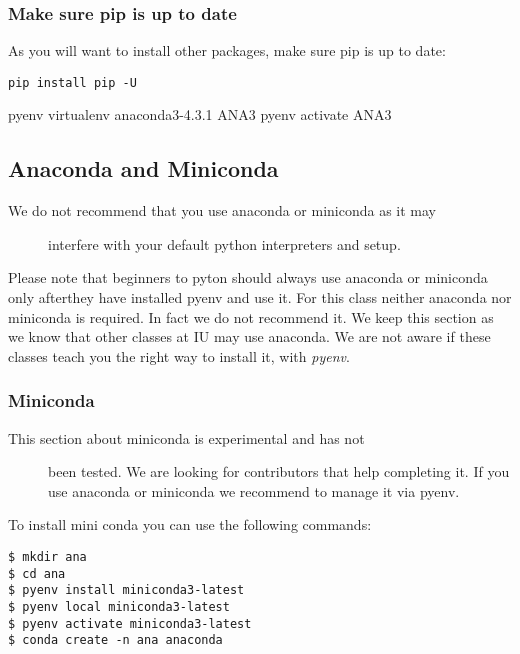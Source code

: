 \subsubsection{Make sure pip is up to
date}\label{make-sure-pip-is-up-to-date}

As you will want to install other packages, make sure pip is up to date:

\begin{verbatim}
pip install pip -U
\end{verbatim}

pyenv virtualenv anaconda3-4.3.1 ANA3 pyenv activate ANA3

\subsection{Anaconda and Miniconda}\label{anaconda-and-miniconda}

\begin{description}
\item[We do not recommend that you use anaconda or miniconda as it may]
interfere with your default python interpreters and setup.
\end{description}

Please note that beginners to pyton should always use anaconda or
miniconda only afterthey have installed pyenv and use it. For this class
neither anaconda nor miniconda is required. In fact we do not recommend
it. We keep this section as we know that other classes at IU may use
anaconda. We are not aware if these classes teach you the right way to
install it, with \emph{pyenv}.

\subsubsection{Miniconda}\label{miniconda}

\begin{description}
\item[This section about miniconda is experimental and has not]
been tested. We are looking for contributors that help completing it. If
you use anaconda or miniconda we recommend to manage it via pyenv.
\end{description}

To install mini conda you can use the following commands:

\begin{verbatim}
$ mkdir ana
$ cd ana
$ pyenv install miniconda3-latest
$ pyenv local miniconda3-latest
$ pyenv activate miniconda3-latest
$ conda create -n ana anaconda
\end{verbatim}

